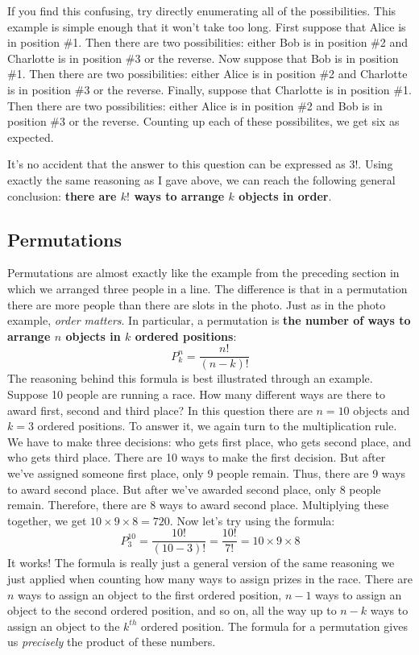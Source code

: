 \documentclass[12pt]{article}
\begin{document}
If you find this confusing, try directly enumerating all of the possibilities.
This example is simple enough that it won't take too long.
First suppose that Alice is in position \#1.
Then there are two possibilities: either Bob is in position \#2 and Charlotte is in position \#3 or the reverse.
Now suppose that Bob is in position \#1.
Then there are two possibilities: either Alice is in position \#2 and Charlotte is in position \#3 or the reverse.
Finally, suppose that Charlotte is in position \#1.
Then there are two possibilities: either Alice is in position \#2 and Bob is in position \#3 or the reverse.
Counting up each of these possibilites, we get six as expected.

It's no accident that the answer to this question can be expressed as $3!$.
Using exactly the same reasoning as I gave above, we can reach the following general conclusion: \textbf{there are $k!$ ways to arrange $k$ objects in order}.

\subsection*{Permutations}
Permutations are almost exactly like the example from the preceding section in which we arranged three people in a line.
The difference is that in a permutation there are more people than there are slots in the photo.
Just as in the photo example, \emph{order matters}.
In particular, a permutation is \textbf{the number of ways to arrange $n$ objects in $k$ ordered positions}:
\begin{equation*}
  P^n_k = \frac{n!}{\left( n-k \right)!}
\end{equation*}
The reasoning behind this formula is best illustrated through an example.
Suppose 10 people are running a race.
How many different ways are there to award first, second and third place?
In this question there are $n=10$ objects and $k=3$ ordered positions.
To answer it, we again turn to the multiplication rule.
We have to make three decisions: who gets first place, who gets second place, and who gets third place.
There are 10 ways to make the first decision.
But after we've assigned someone first place, only 9 people remain.
Thus, there are 9 ways to award second place.
But after we've awarded second place, only 8 people remain.
Therefore, there are 8 ways to award second place.
Multiplying these together, we get $10 \times 9 \times 8 = 720$.
Now let's try using the formula:
\begin{equation*}
  P^{10}_{3} = \frac{10!}{\left( 10-3 \right)!} = \frac{10!}{7!}= 10 \times 9 \times 8
\end{equation*}
It works!
The formula is really just a general version of the same reasoning we just applied when counting how many ways to assign prizes in the race.
There are $n$ ways to assign an object to the first ordered position, $n-1$ ways to assign an object to the second ordered position, and so on, all the way up to $n-k$ ways to assign an object to the $k^{th}$ ordered position.
The formula for a permutation gives us \emph{precisely} the product of these numbers.
\end{document}
